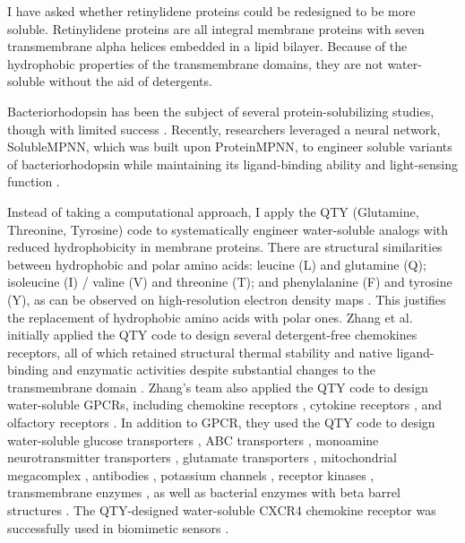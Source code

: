 \documentclass[fleqn, 10pt]{manuscript}
\begin{document}
I have asked whether retinylidene proteins could be redesigned to be more soluble. Retinylidene proteins are all integral membrane proteins with seven transmembrane alpha helices embedded in a lipid bilayer. Because of the hydrophobic properties of the transmembrane domains, they are not water-soluble without the aid of detergents. 

Bacteriorhodopsin has been the subject of several protein-solubilizing studies, though with limited success \citep{Qing_2022}. Recently, researchers leveraged a neural network, SolubleMPNN, which was built upon ProteinMPNN, to engineer soluble variants of bacteriorhodopsin while maintaining its ligand-binding ability and light-sensing function \citep{Nikolaev_2024}.

Instead of taking a computational approach, I apply the QTY (Glutamine, Threonine, Tyrosine) code to systematically engineer water-soluble analogs with reduced hydrophobicity in membrane proteins. There are structural similarities between hydrophobic and polar amino acids: leucine (L) and glutamine (Q); isoleucine (I) / valine (V) and threonine (T); and phenylalanine (F) and tyrosine (Y), as can be observed on high-resolution electron density maps \citep{Zhang_2018, Zhang_2022, Tegler_2020}. This justifies the replacement of hydrophobic amino acids with polar ones. Zhang et al. initially applied the QTY code to design several detergent-free chemokines receptors, all of which retained structural thermal stability and native ligand-binding and enzymatic activities despite substantial changes to the transmembrane domain \citep{Zhang_2018, Tegler_2020}. Zhang's team also applied the QTY code to design water-soluble GPCRs, including chemokine receptors \citep{Zhang_2018, Qing_2019, Tegler_2020, Skuhersky_2021}, cytokine receptors \citep{Hao_2020}, and olfactory receptors \citep{Skuhersky_2021, Johnsson_2025}. In addition to GPCR, they used the QTY code to design water-soluble glucose transporters \citep{Smorodina_2022}, ABC transporters \citep{Pan_2024}, monoamine neurotransmitter transporters \citep{Karagol_Karagol_Alper_2024}, glutamate transporters \citep{Karagol_Karagol_Smorodina_2024, Karagol_2024}, mitochondrial megacomplex \citep{Chen_2025}, antibodies \citep{Li_Wang_2024}, potassium channels \citep{Smorodina_2024}, receptor kinases \citep{Li_Tang_2024}, transmembrane enzymes \citep{Chen_Pan_2025}, as well as bacterial enzymes with beta barrel structures \citep{Sajeev-Sheeja_2023, Sajeev-Sheeja_2024}. The QTY-designed water-soluble CXCR4 chemokine receptor was successfully used in biomimetic sensors \citep{Qing_2023}. 
\end{document}
